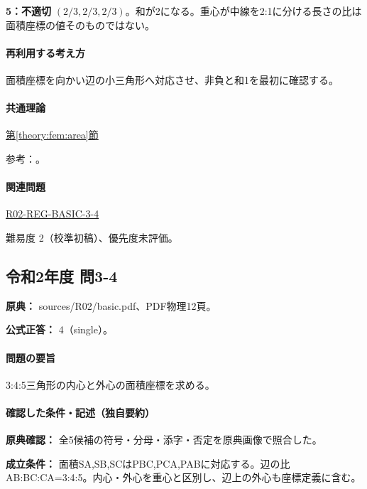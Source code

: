 \noindent\textbf{5：不適切} \((2/3,2/3,2/3)\)。和が2になる。重心が中線を2:1に分ける長さの比は面積座標の値そのものではない。\par

\paragraph{再利用する考え方} 面積座標を向かい辺の小三角形へ対応させ、非負と和1を最初に確認する。

\paragraph{共通理論} \hyperref[theory:fem:area]{第\ref*{theory:fem:area}節}

\par 参考：\cite{mit_roy_fea1999}。

\paragraph{関連問題} \hyperref[q:r02-reg-basic-3-4]{R02-REG-BASIC-3-4}

\par 難易度 2（校準初稿）、優先度未評価。

\subsection{令和2年度 問3-4}
\label{q:r02-reg-basic-3-4}

\noindent\textbf{原典：} sources/R02/basic.pdf、PDF物理12頁。

\textbf{公式正答：} 4（single）。

\paragraph{問題の要旨} 3:4:5三角形の内心と外心の面積座標を求める。

\paragraph{確認した条件・記述（独自要約）}\mbox{}\par

\noindent\textbf{原典確認：} 全5候補の符号・分母・添字・否定を原典画像で照合した。\par

\noindent\textbf{成立条件：} 面積SA,SB,SCはPBC,PCA,PABに対応する。辺の比AB:BC:CA=\allowbreak{}3:4:5。内心・外心を重心と区別し、辺上の外心も座標定義に含む。\par

